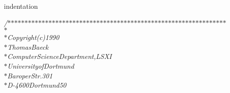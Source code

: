 %
%
\expandafter\ifx\csname indentation\endcsname\relax
\newlength{\indentation}\fi
\setlength{\indentation}{0.5em}
\begin{flushleft}
{\it /$\ast$$\ast$$\ast$$\ast$$\ast$$\ast$$\ast$$\ast$$\ast$$\ast$$\ast$$\ast$$\ast$$\ast$$\ast$$\ast$$\ast$$\ast$$\ast$$\ast$$\ast$$\ast$$\ast$$\ast$$\ast$$\ast$$\ast$$\ast$$\ast$$\ast$$\ast$$\ast$$\ast$$\ast$$\ast$$\ast$$\ast$$\ast$$\ast$$\ast$$\ast$$\ast$$\ast$$\ast$$\ast$$\ast$$\ast$$\ast$$\ast$$\ast$$\ast$$\ast$$\ast$$\ast$$\ast$$\ast$$\ast$$\ast$$\ast$$\ast$$\ast$$\ast$$\ast$$\ast$\mbox{}\\
\hspace*{1\indentation}$\ast$\mbox{}\\
\hspace*{1\indentation}$\ast$\hspace*{2\indentation}Copyright\hspace*{1\indentation}(c)\hspace*{1\indentation}1990\mbox{}\\
\hspace*{1\indentation}$\ast$\hspace*{2\indentation}Thomas\hspace*{1\indentation}Baeck\mbox{}\\
\hspace*{1\indentation}$\ast$\hspace*{2\indentation}Computer\hspace*{1\indentation}Science\hspace*{1\indentation}Department,\hspace*{1\indentation}LSXI\mbox{}\\
\hspace*{1\indentation}$\ast$\hspace*{2\indentation}University\hspace*{1\indentation}of\hspace*{1\indentation}Dortmund\mbox{}\\
\hspace*{1\indentation}$\ast$\hspace*{2\indentation}Baroper\hspace*{1\indentation}Str.\hspace*{1\indentation}301\mbox{}\\
\hspace*{1\indentation}$\ast$\hspace*{2\indentation}D-4600\hspace*{1\indentation}Dortmund\hspace*{1\indentation}50\mbox{}\\
$$}
\end{flushleft}
